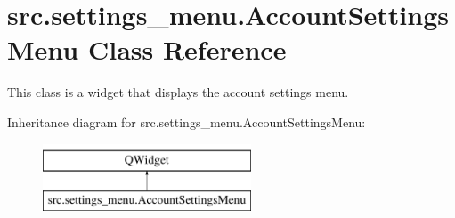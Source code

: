 \hypertarget{classsrc_1_1settings__menu_1_1_account_settings_menu}{}\section{src.\+settings\+\_\+menu.\+Account\+Settings\+Menu Class Reference}
\label{classsrc_1_1settings__menu_1_1_account_settings_menu}


This class is a widget that displays the account settings menu.  


Inheritance diagram for src.\+settings\+\_\+menu.\+Account\+Settings\+Menu\+:\begin{figure}[H]
\begin{center}
\leavevmode
\includegraphics[height=2.000000cm]{classsrc_1_1settings__menu_1_1_account_settings_menu}
\end{center}
\end{figure}
